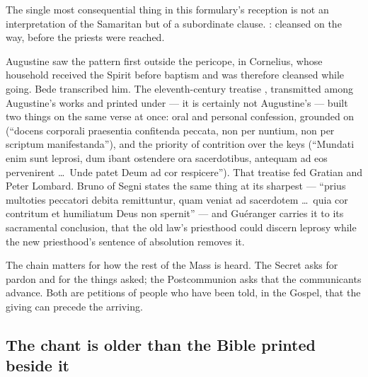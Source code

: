 The single most consequential thing in this formulary's reception is not an
interpretation of the Samaritan but of a subordinate clause. : cleansed on the way, before the priests were
reached.

Augustine saw the pattern first outside the pericope, in Cornelius, whose
household received the Spirit before baptism and was therefore cleansed while
going. Bede transcribed him. The eleventh-century treatise , transmitted among Augustine's works and printed under
 --- it is certainly not Augustine's --- built two
things on the same verse at once: oral and personal confession, grounded on
 (``docens corporali praesentia confitenda
peccata, non per nuntium, non per scriptum manifestanda''), and the priority
of contrition over the keys (``Mundati enim sunt leprosi, dum ibant ostendere
ora sacerdotibus, antequam ad eos pervenirent \dots\ Unde patet Deum ad cor
respicere''). That treatise fed Gratian and Peter Lombard. Bruno of Segni states
the same thing at its sharpest --- ``prius multoties peccatori debita
remittuntur, quam veniat ad sacerdotem \dots\ quia cor contritum et humiliatum
Deus non spernit'' --- and Guéranger carries it to its sacramental conclusion,
that the old law's priesthood could discern leprosy while the new priesthood's
sentence of absolution removes it.

The chain matters for how the rest of the Mass is heard. The Secret asks for
pardon and for the things asked; the Postcommunion asks that the communicants
advance. Both are petitions of people who have been told, in the Gospel, that
the giving can precede the arriving.

\subsection*{The chant is older than the Bible printed beside it}


